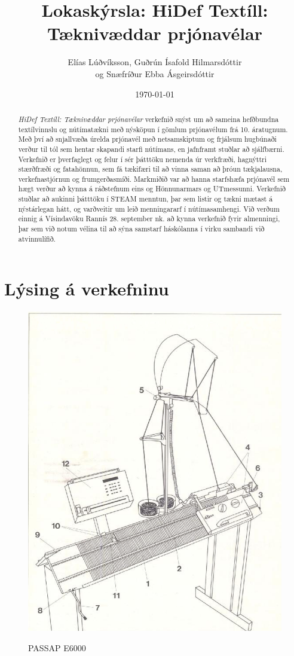 \documentclass[a4paper,12pt,twoside]{article}
\title{Lokaskýrsla: HiDef Textíll: \\ Tæknivæddar prjónavélar}
\author{Elías Lúðvíksson, Guðrún Ísafold Hilmarsdóttir\\ og Snæfríður Ebba Ásgeirsdóttir}
\date{\today}
\begin{document}
\maketitle
\begin{abstract}
    \emph{HiDef Textíll: Tæknivæddar prjónavélar} verkefnið snýst um að sameina hefðbundna textílvinnslu og nútímatækni með nýsköpun í gömlum prjónavélum frá 10. áratugnum. Með því að snjallvæða úrelda prjónavél með netsamskiptum og frjálsum hugbúnaði verður til tól sem hentar skapandi starfi nútímans, en jafnframt stuðlar að sjálfbærni. Verkefnið er þverfaglegt og felur í sér þátttöku nemenda úr verkfræði, hagnýttri stærðfræði og fatahönnun, sem fá tækifæri til að vinna saman að þróun tækjalausna, verkefnastjórnun og frumgerðasmíði. Markmiðið var að hanna starfshæfa prjónavél sem hægt verður að kynna á ráðstefnum eins og Hönnunarmars og UTmessunni. Verkefnið stuðlar að aukinni þátttöku í STEAM menntun, þar sem listir og tækni mætast á nýstárlegan hátt, og varðveitir um leið menningararf í nútímasamhengi. Við verðum einnig á Vísindavöku Rannís 28. september nk. að kynna verkefnið fyrir almenningi, þar sem við notum vélina til að sýna samstarf háskólanna í virku sambandi við atvinnulífið.
\end{abstract}

\tableofcontents
\newpage

\section{Lýsing á verkefninu}


\begin{figure} 
    \centering \label{img:passap}
    \includegraphics[width=.9\linewidth]{myndir/skema-e6000.png}
    \caption{PASSAP E6000}
\end{figure}
\end{document}
